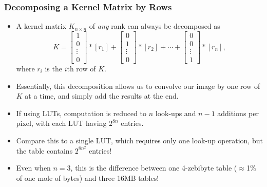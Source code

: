 \documentclass{beamer}
\newcommand{\R}{\mathbb{R}}
\begin{document}
\begin{frame}\frametitle{Decomposing a Kernel Matrix by Rows}
\begin{itemize}
\item A kernel matrix $K_{n\times n}$ of \emph{any} rank can always be decomposed as
$$K = \left[\begin{matrix}1\\0\\\vdots\\0\end{matrix}\right]*[r_1] + \left[\begin{matrix}0\\1\\\vdots\\0\end{matrix}\right]*[r_2] + \cdots + \left[\begin{matrix}0\\0\\\vdots\\1\end{matrix}\right]*[r_n],$$
where $r_i$ is the $i$th row of $K$.
\pause\item Essentially, this decomposition allows us to convolve our image by one row of $K$ at a time, and simply add the results at the end.
\pause\item If using LUTs, computation is reduced to $n$ look-ups and $n-1$ additions per pixel, with each LUT having $2^{8n}$ entries.
\pause\item Compare this to a single LUT, which requires only one look-up operation, but the table contains $2^{8n^2}$ entries!
\pause\item Even when $n=3$, this is the difference between one 4-zebibyte table ($\approx$1\% of one mole of bytes) and three 16MB tables!
\end{itemize}
\end{frame}
\end{document}
